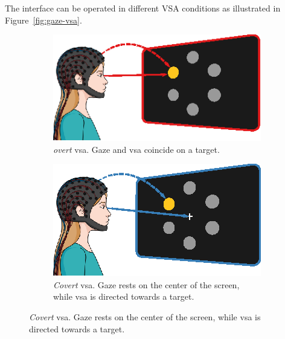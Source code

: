 The interface can be operated in different VSA conditions as illustrated in
Figure~\ref{fig:gaze-vsa}.

\begin{figure}
  \begin{subfigure}[t]{.45\textwidth}
    \includegraphics[width=\textwidth]{figures/gaze_independence/attention_overt.eps}
    \caption[Overt \ac{vsa}]{%
      \emph{overt} \ac{vsa}.
      Gaze and \ac{vsa} coincide on a target.
    }
    \label{fig:gaze/vsa/overt}
  \end{subfigure}\hfill%
  \begin{subfigure}[t]{.45\textwidth}
    \includegraphics[width=\textwidth]{figures/gaze_independence/attention_covert.eps}
    \caption[Covert \ac{vsa}]{%
      \emph{Covert} \ac{vsa}.
      Gaze rests on the center of the screen, while \ac{vsa} is directed towards a target.
    }
    \label{fig:gaze/vsa/covert}
  \end{subfigure}


\end{figure}
